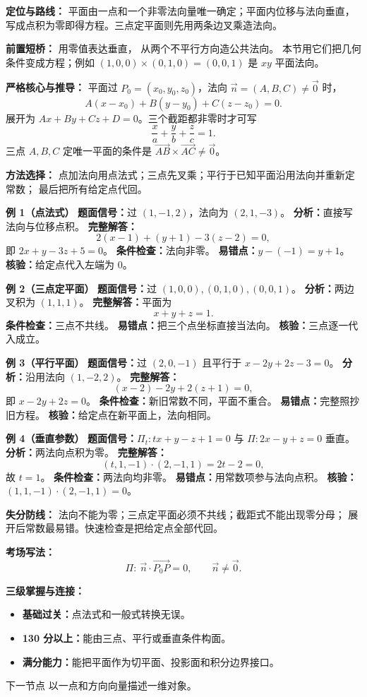 \begin{knowledgeBox}
\textbf{定位与路线：}
平面由一点和一个非零法向量唯一确定；平面内位移与法向垂直，
写成点积为零即得方程。三点定平面则先用两条边叉乘造法向。

\textbf{前置短桥：}
用零值表达垂直，
从两个不平行方向造公共法向。
本节用它们把几何条件变成方程；例如
\((1,0,0)\times(0,1,0)=(0,0,1)\) 是 \(xy\) 平面法向。

\textbf{严格核心与推导：}
平面过 \(P_0=(x_0,y_0,z_0)\)，法向
\(\vec n=(A,B,C)\ne\vec0\) 时，
\[
A(x-x_0)+B(y-y_0)+C(z-z_0)=0.
\]
展开为 \(Ax+By+Cz+D=0\)。三个截距都非零时才可写
\[
\frac xa+\frac yb+\frac zc=1.
\]
三点 \(A,B,C\) 定唯一平面的条件是
\(\overrightarrow{AB}\times\overrightarrow{AC}\ne\vec0\)。

\textbf{方法选择：}
点加法向用点法式；三点先叉乘；平行于已知平面沿用法向并重新定常数；
最后把所有给定点代回。

\textbf{例 1（点法式）}
\textbf{题面信号：}过 \((1,-1,2)\)，法向为 \((2,1,-3)\)。
\textbf{分析：}直接写法向与位移点积。
\textbf{完整解答：}
\[
2(x-1)+(y+1)-3(z-2)=0,
\]
即 \(2x+y-3z+5=0\)。
\textbf{条件检查：}法向非零。
\textbf{易错点：}\(y-(-1)=y+1\)。
\textbf{核验：}给定点代入左端为 \(0\)。

\textbf{例 2（三点定平面）}
\textbf{题面信号：}过 \((1,0,0),(0,1,0),(0,0,1)\)。
\textbf{分析：}两边叉积为 \((1,1,1)\)。
\textbf{完整解答：}平面为
\[
x+y+z=1.
\]
\textbf{条件检查：}三点不共线。
\textbf{易错点：}把三个点坐标直接当法向。
\textbf{核验：}三点逐一代入成立。

\textbf{例 3（平行平面）}
\textbf{题面信号：}过 \((2,0,-1)\) 且平行于
\(x-2y+2z-3=0\)。
\textbf{分析：}沿用法向 \((1,-2,2)\)。
\textbf{完整解答：}
\[
(x-2)-2y+2(z+1)=0,
\]
即 \(x-2y+2z=0\)。
\textbf{条件检查：}新旧常数不同，平面不重合。
\textbf{易错点：}完整照抄旧方程。
\textbf{核验：}给定点在新平面上，法向相同。

\textbf{例 4（垂直参数）}
\textbf{题面信号：}\(\Pi_t:tx+y-z+1=0\) 与
\(\Pi:2x-y+z=0\) 垂直。
\textbf{分析：}两法向点积为零。
\textbf{完整解答：}
\[
(t,1,-1)\cdot(2,-1,1)=2t-2=0,
\]
故 \(t=1\)。
\textbf{条件检查：}两法向均非零。
\textbf{易错点：}用常数项参与法向点积。
\textbf{核验：}\((1,1,-1)\cdot(2,-1,1)=0\)。

\textbf{失分防线：}
法向不能为零；三点定平面必须不共线；截距式不能出现零分母；
展开后常数最易错。快速检查是把给定点全部代回。

\textbf{考场写法：}
\[
\boxed{\Pi:\ \vec n\cdot\overrightarrow{P_0P}=0,\qquad \vec n\ne\vec0.}
\]

\textbf{三级掌握与连接：}
\begin{itemize}
  \item \textbf{基础过关：}点法式和一般式转换无误。
  \item \textbf{130 分以上：}能由三点、平行或垂直条件构面。
  \item \textbf{满分能力：}能把平面作为切平面、投影面和积分边界接口。
\end{itemize}
下一节点 
以一点和方向向量描述一维对象。
\end{knowledgeBox}

